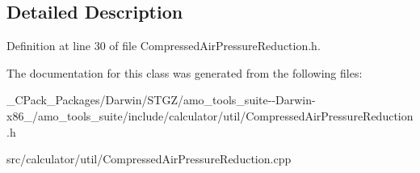 \subsection{Detailed Description}


Definition at line 30 of file Compressed\+Air\+Pressure\+Reduction.\+h.



The documentation for this class was generated from the following files\+:\begin{DoxyCompactItemize}
\item 
\+\_\+\+C\+Pack\+\_\+\+Packages/\+Darwin/\+S\+T\+G\+Z/amo\+\_\+tools\+\_\+suite-\/-\/\+Darwin-\/x86\+\_/amo\+\_\+tools\+\_\+suite/include/calculator/util/Compressed\+Air\+Pressure\+Reduction.\+h\item 
src/calculator/util/Compressed\+Air\+Pressure\+Reduction.\+cpp\end{DoxyCompactItemize}
